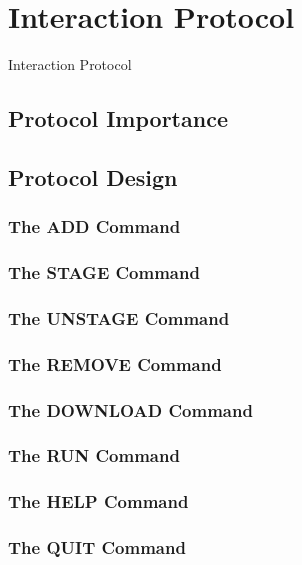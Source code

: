 \chapter{Interaction Protocol}\label{chap:interactionProtocol}
Interaction Protocol

  \section{Protocol Importance}

  \section{Protocol Design}
    \subsection{The ADD Command}
    \subsection{The STAGE Command}
    \subsection{The UNSTAGE Command}
    \subsection{The REMOVE Command}
    \subsection{The DOWNLOAD Command}
    \subsection{The RUN Command}
    \subsection{The HELP Command}
    \subsection{The QUIT Command}

